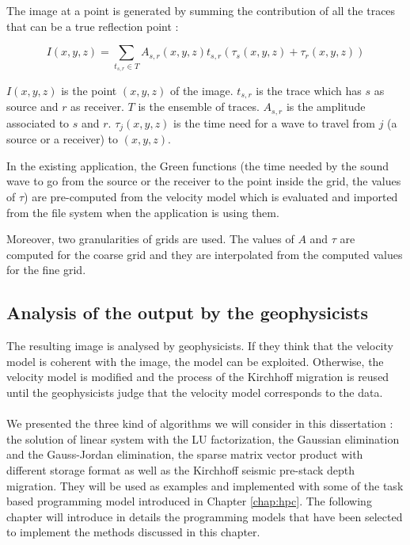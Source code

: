 The image at a point is generated by summing the contribution of all the traces that can be a true reflection point :


\begin{equation}
	I(x,y,z)=\sum_{t_{s,r} \in T}A_{s,r}(x,y,z)t_{s,r}(\tau_s(x,y,z) + \tau_r(x,y,z))
\end{equation}

$I(x,y,z)$ is the point $(x,y,z)$ of the image.
$t_{s,r}$ is the trace which has $s$ as source and $r$ as receiver.
$T$ is the ensemble of traces.
$A_{s,r}$ is the amplitude associated to $s$ and $r$.
$\tau_j(x,y,z)$  is the time need for a wave to travel from $j$ (a source or a receiver) to $(x,y,z)$.


In the existing application, the Green functions (the time needed by the sound wave to go from the source or the receiver to the point inside the grid, the values of $\tau$) are pre-computed from the velocity model which is evaluated and imported from the file system when the application is using them.

Moreover, two granularities of grids are used.
The values of $A$ and $\tau$ are computed for the coarse grid and they are interpolated from the computed values for the fine grid.


\subsection{Analysis of the output by the geophysicists}
The resulting image is analysed by geophysicists.
If they think that the velocity model is coherent with the image, the model can be exploited.
Otherwise, the velocity model is modified and the process of the Kirchhoff migration is reused until the geophysicists judge that the velocity model corresponds to the data.

\paragraph{}
We presented the three kind of algorithms we will consider in this dissertation : the solution of linear system with the LU factorization, the Gaussian elimination and the Gauss-Jordan elimination, the sparse matrix vector product with different storage format as well as the Kirchhoff seismic pre-stack depth migration.
They will be used as examples and implemented with some of the task based programming model introduced in Chapter \ref{chap:hpc}.
The following chapter will introduce in details the programming models that have been selected to implement the methods discussed in this chapter.
